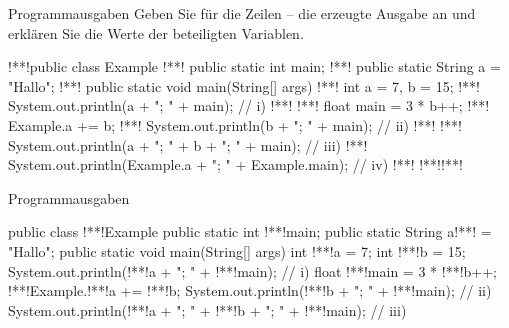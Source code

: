 {
\begin{frame}[c,fragile]{Programmausgaben}
Geben Sie für die Zeilen -- die erzeugte Ausgabe an und erklären Sie die Werte der beteiligten Variablen.
\begin{plainjava}
!**!public class Example {
!**!   public static int main;
!**!   public static String a = "Hallo";
!**!   public static void main(String[] args) {
!**!      int a = 7,  b = 15;
!**!      System.out.println(a + "; " + main); // i)
!**!      {
!**!         float main = 3 * b++;
!**!         Example.a += b;
!**!         System.out.println(b + "; " + main); // ii)
!**!      }
!**!      System.out.println(a + "; " + b + "; " + main); // iii)
!**!      System.out.println(Example.a + "; " + Example.main); // iv)
!**!   }
!**!}!**!
\end{plainjava}
%
\end{frame}
\SidebarReset
\SidebarSolution
\def\Show<#1>#2;{\onslide<#1->{{\only<#1|handout:1>{\colorlet{@}{gray}}\path[@]#2;}}}
\def\ShowFull<#1>#2;{\onslide<#1-|handout:2>{{\only<#1>{\colorlet{@}{gray}}\path[@]#2;}}}
\begin{frame}[c,fragile]{Programmausgaben}
\begin{plainjava}
public class !**!Example {
   public static int !**!main;
   public static String a!**! = "Hallo";
   public static void main(String[] args) {
      int !**!a = 7;
      int !**!b = 15;
      System.out.println(!**!a + "; " + !**!main); // i)
      {
         float !**!main = 3 * !**!b++;
         !**!Example.!**!a += !**!b;
         System.out.println(!**!b + "; " + !**!main); // ii)
      }
      System.out.println(!**!a + "; " + !**!b + "; " + !**!main); // iii)
}}
\end{plainjava}
\end{frame}}
